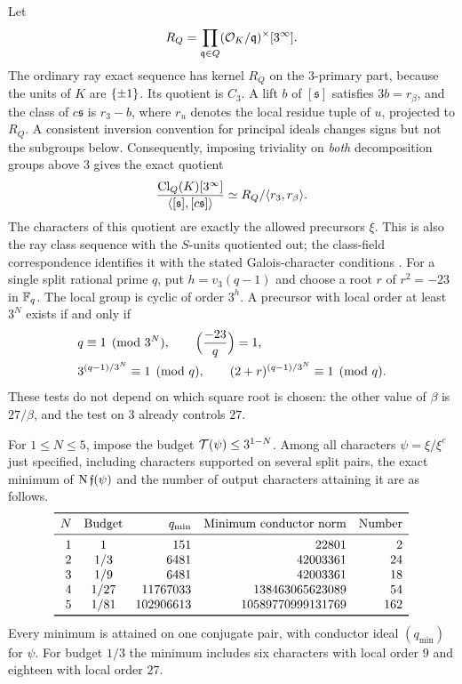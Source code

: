 Let
\[
 R_Q=\prod_{\mathfrak q\in Q}(\mathcal{O}_K/\mathfrak q)^\times[3^\infty].
\]
The ordinary ray exact sequence has kernel $R_Q$ on the $3$-primary part,
because the units of $K$ are $\{\pm1\}$. Its quotient is $C_3$. A lift $b$
of $[\mathfrak s]$ satisfies $3b=r_\beta$, and the class of $c\mathfrak s$
is $r_3-b$, where $r_u$ denotes the local residue tuple of $u$, projected to
$R_Q$. A consistent inversion convention for principal ideals changes signs
but not the subgroups below. Consequently, imposing triviality on \emph{both}
decomposition groups above $3$ gives the exact quotient
\begin{equation}\label{spn:eq:source-twist-quotient}
 \frac{\operatorname{Cl}_Q(K)[3^\infty]}{\langle[\mathfrak s],[c\mathfrak s]\rangle}
 \simeq R_Q/\langle r_3,r_\beta\rangle .
\end{equation}
The characters of this quotient are exactly the allowed precursors $\xi$.
This is also the ray class sequence with the $S$-units quotiented out; the
class-field correspondence identifies it with the stated Galois-character
conditions \cite{Milne2020CFT}. For a single split rational prime $q$, put
$h=v_3(q-1)$ and choose a root $r$ of $r^2=-23$ in $\mathbb{F}_q$. The local group is
cyclic of order $3^h$. A precursor with local order at least $3^N$ exists if
and only if
\begin{equation}\label{spn:eq:residue-tests}
\begin{split}
 &q\equiv1\pmod{3^N},\qquad\Bigl(\frac{-23}{q}\Bigr)=1,\\
 &3^{(q-1)/3^N}\equiv1\pmod q,\qquad(2+r)^{(q-1)/3^N}\equiv1\pmod q .
\end{split}
\end{equation}
These tests do not depend on which square root is chosen: the other value of
$\beta$ is $27/\beta$, and the test on $3$ already controls $27$.

\begin{theorem}\label{spn:thm:source-twist-minimum}
For $1\le N\le5$, impose the budget $\mathcal{T}(\psi)\le3^{1-N}$. Among all
characters $\psi=\xi/\xi^c$ just specified, including characters supported
on several split pairs, the exact minimum of $\operatorname{N}\mathfrak f(\psi)$ and the
number of output characters attaining it are as follows.
\[
\begin{array}{rcrrr}
\toprule
N & \text{Budget} & q_{\min} & \text{Minimum conductor norm} & \text{Number}\\
\midrule
1 & 1    & 151       & 22801             & 2\\
2 & 1/3  & 6481      & 42003361          & 24\\
3 & 1/9  & 6481      & 42003361          & 18\\
4 & 1/27 & 11767033  & 138463065623089   & 54\\
5 & 1/81 & 102906613 & 10589770999131769 & 162\\
\bottomrule
\end{array}
\]
Every minimum is attained on one conjugate pair, with conductor ideal
$(q_{\min})$ for $\psi$. For budget $1/3$ the minimum includes six
characters with local order $9$ and eighteen with local order $27$.
\end{theorem}

